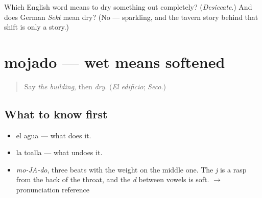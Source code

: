 \begin{tcolorbox}[breakable,colback=teal!4,colframe=teal!35!black,title={Before you move on}]
Which English word means to dry something out completely? (\emph{Desiccate}.) And does German \emph{Sekt} mean dry? (No — sparkling, and the tavern story behind that shift is only a story.)
\end{tcolorbox}
\section[mojado]{mojado — wet means softened}

\label{lesson:ES-C379-mojado}



\begin{quote}
Say \emph{the building}, then \emph{dry}. (\emph{El edificio}; \emph{Seco}.)
\end{quote}

\subsection*{What to know first}
\begin{itemize}
\raggedright
  \item el agua — what does it.
  \item la toalla — what undoes it.
\end{itemize}

\begin{sounds}
\begin{itemize}
\raggedright
  \item \emph{mo-JA-do}, three beats with the weight on the middle one. The \emph{j} is a rasp from the back of the throat, and the \emph{d} between vowels is soft. $\to$ pronunciation reference
\end{itemize}
\end{sounds}

